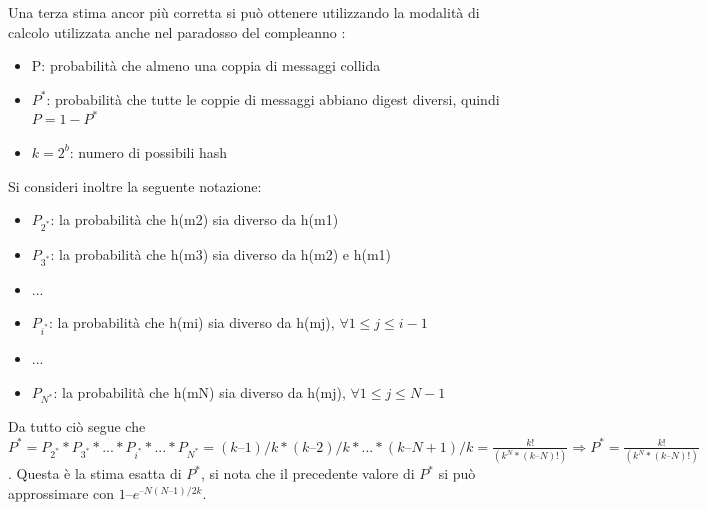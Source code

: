 Una terza stima ancor più corretta si può ottenere utilizzando la modalità di calcolo utilizzata anche nel paradosso del compleanno :
\begin{itemize}
\item P: probabilità che almeno una coppia di messaggi collida
\item $P^{*}$: probabilità che tutte le coppie di messaggi abbiano digest diversi, quindi $P = 1 - P^{*}$
\item $k = 2^{b}$: numero di possibili hash
\end{itemize}
Si consideri inoltre la seguente notazione:
\begin{itemize}
\item $P_{2^{*}}$: la probabilità che h(m2) sia diverso da h(m1)
\item $P_{3^{*}}$: la probabilità che h(m3) sia diverso da h(m2) e h(m1)
\item ...
\item $P_{i^{*}}$: la probabilità che h(mi) sia diverso da h(mj), $\forall 1\leq j \leq i-1$
\item ...
\item $P_{N^{*}}$: la probabilità che h(mN) sia diverso da h(mj), $\forall 1\leq j \leq N-1$
\end{itemize}
Da tutto ciò segue che $P^{*}=P_{2^{*}}*P_{3^{*}}*...*P_{i^{*}}*...*P_{N^{*}}=
(k – 1)/k*(k – 2)/k*...*(k – N + 1)/k = \frac{k!}{(k^{N}*(k – N)!)}\Rightarrow P^{*} = \frac{k!}{(k^{N}*(k – N)!)}$.
Questa è la stima esatta di $P^{*}$, si nota che il precedente valore di $P^{*}$ si può approssimare con $1 – e^{– N(N – 1)/2k}$.


